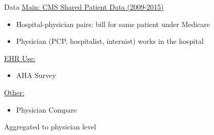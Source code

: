 \documentclass[10pt]{beamer}
\begin{document}
\begin{frame}{Data}
    \underline{Main: CMS Shared Patient Data (2009-2015)}
    \begin{itemize}
        \item Hospital-physician pairs: bill for same patient under Medicare
        \item Physician (PCP, hospitalist, internist) works in the hospital
    \end{itemize}
    
    \vspace{3mm}
    
    \underline{EHR Use:}
    \begin{itemize}
        \item AHA Survey
    \end{itemize}
    
    \vspace{3mm}
    
    \underline{Other:}
    \begin{itemize}
        \item Physician Compare
    \end{itemize}
    
    \vspace{3mm}
    
    Aggregated to physician level
\end{frame}
\end{document}
